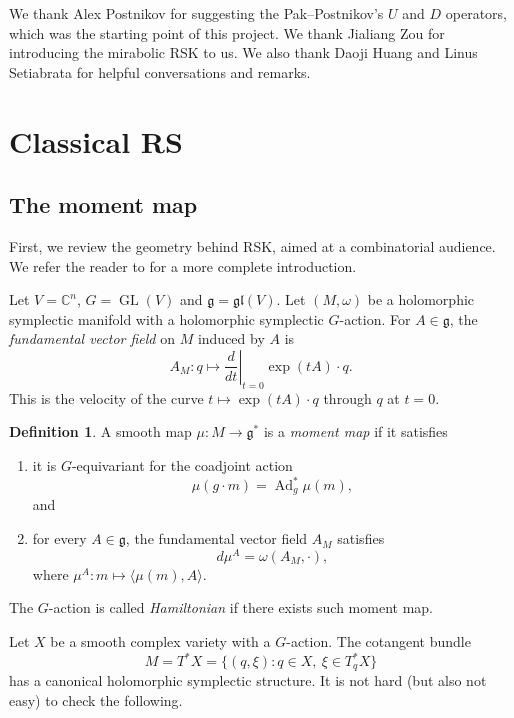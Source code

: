 \documentclass[12pt,a4paper]{article}
\def\GL{\operatorname{GL}}
\theoremstyle{plain}
\theoremstyle{definition}
\newtheorem{definition}[thm]{Definition}
\theoremstyle{remark}
\newcommand{\CC}{\mathbb{C}}
\def\gfrak{\mathfrak{g}}
\begin{document}
    We thank Alex Postnikov for suggesting the Pak--Postnikov's $U$ and $D$ operators, which was the starting point of this project. We thank Jialiang Zou for introducing the mirabolic RSK to us. We also thank Daoji Huang and Linus Setiabrata for helpful conversations and remarks.

\section{Classical RS}\label{sec:RS}

\subsection{The moment map}

    First, we review the geometry behind RSK, aimed at a combinatorial audience. We refer the reader to \cite{da2004lectures} for a more complete introduction.

    Let $V = \CC^n$, $G = \GL(V)$ and $\gfrak = \mathfrak{gl}(V)$. Let $(M,\omega)$ be a holomorphic symplectic manifold with a holomorphic symplectic $G$-action. For $A \in \gfrak$, the \textit{fundamental vector field} on $M$ induced by $A$ is
    \[
    A_M:q\mapsto \left.\dfrac{d}{dt}\right|_{t=0} \exp(tA)\cdot q.
    \]
    This is the velocity of the curve $t\mapsto \exp(tA)\cdot q$ through $q$ at $t = 0$.

    \begin{definition}\label{def:moment-map}
        A smooth map $\mu:M\to\mathfrak g^*$ is a \textit{moment map} if it satisfies
        \begin{enumerate}
            \item[(a)] it is $G$-equivariant for the coadjoint action
            \[
             \mu(g\cdot m)=\operatorname{Ad}_g^*\mu(m),
            \]
            and
            \item[(b)] for every $A\in\mathfrak g$, the fundamental vector field $A_M$ satisfies
            \[
            d\mu^A=\omega(A_M,\cdot),
            \]
            where $\mu^A: m\mapsto \langle\mu(m),A\rangle$.
        \end{enumerate}
        The $G$-action is called \textit{Hamiltonian} if there exists such moment map.
    \end{definition}

    Let $X$ be a smooth complex variety with a $G$-action. The cotangent bundle
    \[
    M = T^*X = \{(q,\xi):q\in X,\ \xi\in T_q^*X\}
    \]
    has a canonical holomorphic symplectic structure. It is not hard (but also not easy) to check the following.
\end{document}
